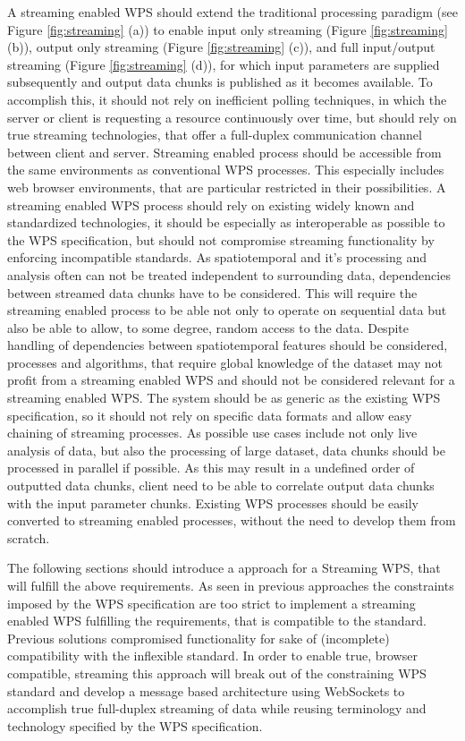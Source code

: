 	A streaming enabled \ac{WPS} should extend the traditional processing paradigm (see Figure \ref{fig:streaming} (a)) to enable input only streaming (Figure \ref{fig:streaming} (b)), output only streaming (Figure \ref{fig:streaming} (c)), and full input/output streaming (Figure \ref{fig:streaming} (d)), for which input parameters are supplied subsequently and output data chunks is published as it becomes available. To accomplish this, it should not rely on inefficient polling techniques, in which the server or client is requesting a resource continuously over time, but should rely on true streaming technologies, that offer a full-duplex communication channel between client and server. Streaming enabled process should be accessible from the same environments as conventional \ac{WPS} processes. This especially includes web browser environments, that are particular restricted in their possibilities. A streaming enabled \ac{WPS} process should rely on existing widely known and standardized technologies, it should be especially as interoperable as possible to the \ac{WPS} specification, but should not compromise streaming functionality by enforcing incompatible standards. As spatiotemporal and it's processing and analysis often can not be treated independent to surrounding data, dependencies between streamed data chunks have to be considered. This will require the streaming enabled process to be able not only to operate on sequential data but also be able to allow, to some degree, random access to the data. Despite handling of dependencies between spatiotemporal features should be considered, processes and algorithms, that require global knowledge of the dataset may not profit from a streaming enabled WPS and should not be considered relevant for a streaming enabled \ac{WPS}. The system should be as generic as the existing \ac{WPS} specification, so it should not rely on specific data formats and allow easy chaining of streaming processes. As possible use cases include not only live analysis of data, but also the processing of large dataset, data chunks should be processed in parallel if possible. As this may result in a undefined order of outputted data chunks, client need to be able to correlate output data chunks with the input parameter chunks. Existing \ac{WPS} processes should be easily converted to streaming enabled processes, without the need to develop them from scratch.

	The following sections should introduce a approach for a Streaming \ac{WPS}, that will fulfill the above requirements. As seen in previous approaches the constraints imposed by the \ac{WPS} specification are too strict to implement a streaming enabled WPS fulfilling the requirements, that is compatible to the standard. Previous solutions compromised functionality for sake of (incomplete) compatibility with the inflexible standard. In order to enable true, browser compatible, streaming this approach will break out of the constraining \ac{WPS} standard and develop a message based architecture using WebSockets to accomplish true full-duplex streaming of data while reusing terminology and technology specified by the \ac{WPS} specification.

